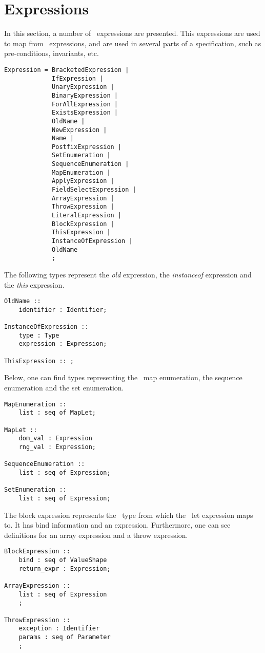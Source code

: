 \section{Expressions}

In this section, a number of \jml\ expressions are presented. This expressions are used to map from \vpp\ expressions, and are used in several parts of a specification, such as pre-conditions, invariants, etc.

\begin{lstlisting}
Expression = BracketedExpression |
             IfExpression |
			 UnaryExpression |
			 BinaryExpression |
			 ForAllExpression |
			 ExistsExpression |
			 OldName |
			 NewExpression |
			 Name |
			 PostfixExpression |
			 SetEnumeration |
			 SequenceEnumeration |
			 MapEnumeration |
			 ApplyExpression |
			 FieldSelectExpression |
			 ArrayExpression |
			 ThrowExpression |
			 LiteralExpression |
			 BlockExpression |
			 ThisExpression |
			 InstanceOfExpression |
			 OldName
			 ;
\end{lstlisting}
\medskip
The following types represent the \textit{old} expression, the \textit{instanceof} expression and the \textit{this} expression.
\medskip
\begin{lstlisting}
OldName ::
	identifier : Identifier;

InstanceOfExpression :: 
	type : Type
	expression : Expression;

ThisExpression :: ;
\end{lstlisting}
\medskip
Below, one can find types representing the \jml\ map enumeration, the sequence enumeration and the set enumeration.
\medskip
\begin{lstlisting}
MapEnumeration ::
	list : seq of MapLet;
	
MapLet ::
	dom_val : Expression
	rng_val : Expression;

SequenceEnumeration ::
	list : seq of Expression;

SetEnumeration ::
	list : seq of Expression;
\end{lstlisting}
\medskip
The block expression represents the \jml\ type from which the \vpp\ let expression maps to. It has bind information and an expression. Furthermore, one can see definitions for an array expression and a throw expression.
\medskip
\begin{lstlisting}
BlockExpression ::
	bind : seq of ValueShape
	return_expr : Expression;

ArrayExpression ::
	list : seq of Expression
	;
	
ThrowExpression ::
	exception : Identifier
	params : seq of Parameter
	;
\end{lstlisting}
